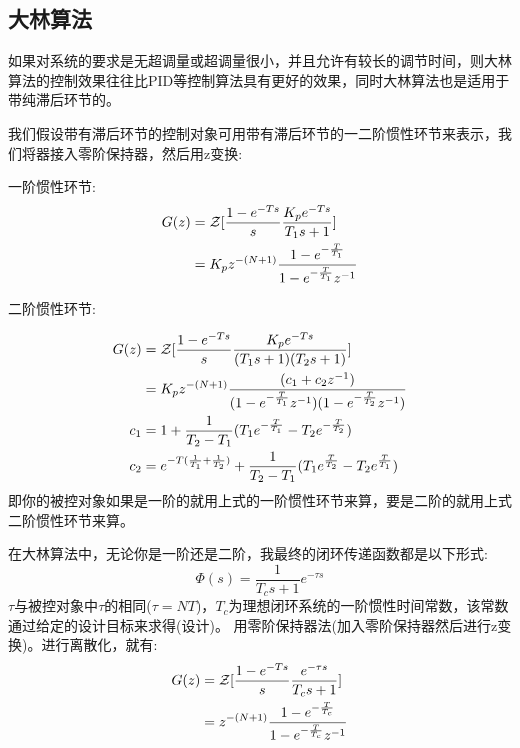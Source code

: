 \documentclass[12pt, a4paper, oneside]{ctexbook}
\begin{document}
\subsection{大林算法}
如果对系统的要求是无超调量或超调量很小，并且允许有较长的调节时间，则大林算法的控制效果往往比PID等控制算法具有更好的效果，同时大林算法也是适用于带纯滞后环节的。

我们假设带有滞后环节的控制对象可用带有滞后环节的一二阶惯性环节来表示，我们将器接入零阶保持器，然后用z变换:

\noindent 一阶惯性环节:
\begin{equation}
	\begin{aligned}
		G(z)&=\mathcal Z[\frac{1-e^{-Ts}}{s}\frac{K_pe^{-Ts}}{T_1s+1}]\\ \notag
		&=K_pz^{-(N+1)}\frac{1-e^{-\frac{T}{T_1}}}{1-e^{-\frac{T}{T_1}}z^{-1}} \notag
	\end{aligned}
\end{equation}

\noindent 二阶惯性环节:

\begin{equation}
	\begin{aligned}
		G(z)&=\mathcal Z[\frac{1-e^{-Ts}}{s}\frac{K_pe^{-Ts}}{(T_1s+1)(T_2s+1)}]\\ \notag
		&=K_pz^{-(N+1)}\frac{(c_1+c_2z^{-1})}{(1-e^{-\frac{T}{T_1}}z^{-1})(1-e^{-\frac{T}{T_2}}z^{-1})} \notag\\
	c_1&=1+\frac{1}{T_2-T_1}(T_1e^{-\frac{T}{T_1}}-T_2e^{-\frac{T}{T_2}})\notag \\ 
	c_2&=e^{-T(\frac{1}{T_1}+\frac{1}{T_2})}+\frac{1}{T_2-T_1}(T_1e^{\frac{T}{T_2}}-T_2e^{\frac{T}{T_1}})
\end{aligned}
\end{equation}
即你的被控对象如果是一阶的就用上式的一阶惯性环节来算，要是二阶的就用上式二阶惯性环节来算。

在大林算法中，无论你是一阶还是二阶，我最终的闭环传递函数都是以下形式:
$$
\varPhi(s)=\frac{1}{T_cs+1}e^{-\tau s}
$$
$\tau$与被控对象中$\tau$的相同($\tau=NT$)，$T_c$为理想闭环系统的一阶惯性时间常数，该常数通过给定的设计目标来求得(设计)。
用零阶保持器法(加入零阶保持器然后进行z变换)。进行离散化，就有:
\begin{equation}
	\begin{aligned}
		G(z)&=\mathcal Z[\frac{1-e^{-Ts}}{s}\frac{e^{-\tau s}}{T_cs+1}]\\ \notag
		&=z^{-(N+1)}\frac{1-e^{-\frac{T}{T_c}}}{1-e^{-\frac{T}{T_c}}z^{-1}} \notag
	\end{aligned}
\end{equation}
\end{document}
